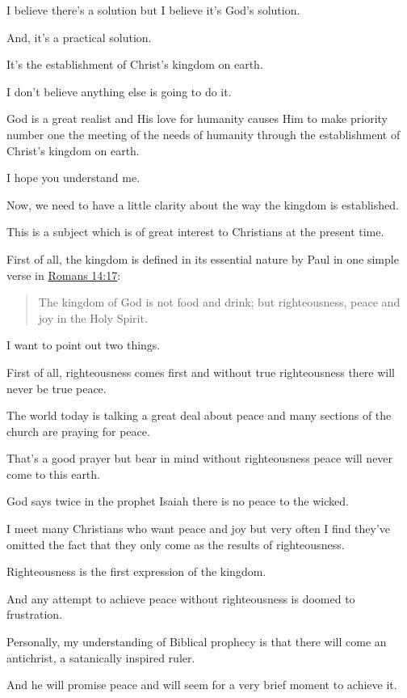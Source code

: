 \documentclass[11pt]{article}
\begin{document}
I believe there's a solution but I believe
it's God's solution.

And, it's a practical solution.

It's the establishment of Christ's kingdom on
earth.

I don't believe anything else is going to do
it.

God is a great realist and His love for
humanity causes Him to make priority number
one the meeting of the needs of humanity
through the establishment of Christ's kingdom
on earth.

I hope you understand me.

Now, we need to have a little clarity about
the way the kingdom is established.

This is a subject which is of great interest
to Christians at the present time.

First of all, the kingdom is defined in its
essential nature by Paul in one simple verse
in \href{https://www.biblegateway.com/passage/?search=Romans\%2014\%3A17\&version=ESV}{Romans 14:17}:

\begin{quote}
The kingdom of God is not food and drink; but righteousness, peace and
joy in the Holy Spirit.
\end{quote}

I want to point out two things.

First of all, righteousness comes first and
without true righteousness there will never be
true peace.

The world today is talking a great deal about
peace and many sections of the church are
praying for peace.

That's a good prayer but bear in mind without
righteousness peace will never come to this
earth.

God says twice in the prophet Isaiah there is
no peace to the wicked.

I meet many Christians who want peace and joy
but very often I find they've omitted the fact
that they only come as the results of
righteousness.

Righteousness is the first expression of the
kingdom.

And any attempt to achieve peace without
righteousness is doomed to frustration.

Personally, my understanding of Biblical
prophecy is that there will come an
antichrist, a satanically inspired ruler.

And he will promise peace and will seem for a
very brief moment to achieve it.
\end{document}
